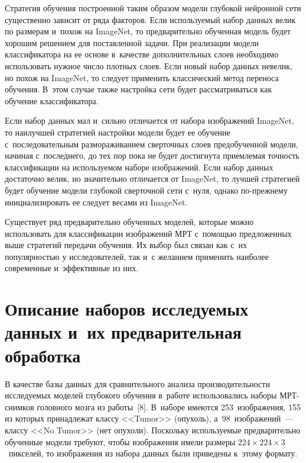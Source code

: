 \begin{multicols}{2}
  Стратегия обучения построенной таким образом модели глубокой нейронной 
сети существенно зависит от ряда факторов. Если используемый набор данных 
велик по размерам и~похож на \mbox{ImageNet}, то предварительно обученная модель 
будет хорошим решением для поставленной задачи. При реализации модели 
классификатора на ее основе в~качестве дополнительных слоев необходимо 
использовать нужное число плотных слоев. Если новый набор данных невелик, 
но похож на ImageNet, то следует применить классический метод переноса 
обучения. В~этом случае также настройка сети будет рассматриваться как 
обучение клас\-си\-фи\-ка\-тора. 
{

}
  
  Если набор данных мал и~сильно отличается от набора изображений 
ImageNet, то наилучшей стратегией настройки модели будет ее обучение 
с~последовательным размораживанием сверточных слоев предобученной 
модели, начиная с~последнего, до тех пор пока не будет достигнута приемлемая 
точность классификации на использу\-емом наборе изображений. Если набор 
данных достаточно велик, но значительно отличается от \mbox{ImageNet}, то лучшей 
стратегией будет обучение модели глубокой сверточной сети с~нуля, однако 
по-прежнему инициализировать ее следует весами из \mbox{ImageNet}.
{

}
  
  Существует ряд предварительно обученных моделей, которые можно 
использовать для классификации изображений МРТ с~помощью предложенных 
выше стратегий передачи обучения. Их выбор был связан как с~их 
популярностью у исследователей, так и~с желанием применить наиболее 
современные и~эффективные из них. 
  
\section{Описание наборов исследуемых данных и~их 
предварительная обработка}

  В качестве базы данных для сравнительного анализа производительности 
исследуемых моделей глубокого обучения в~работе использовались наборы 
МРТ-сним\-ков головного мозга из работы~[8]. В~наборе имеются 
253~изображения, 155 из которых принадлежат классу <<Tumor>> (опухоль), 
а~98~изоб\-ражений~--- классу <<No Tumor>> (нет опухоли). Поскольку 
ис\-поль\-зу\-емые предварительно обучен\-ные модели требуют, чтобы изображения 
имели размеры $224\times224\times3$~пикселей, то изображения из набора 
данных были приведены к~этому фор\-мату. 


\end{multicols}
